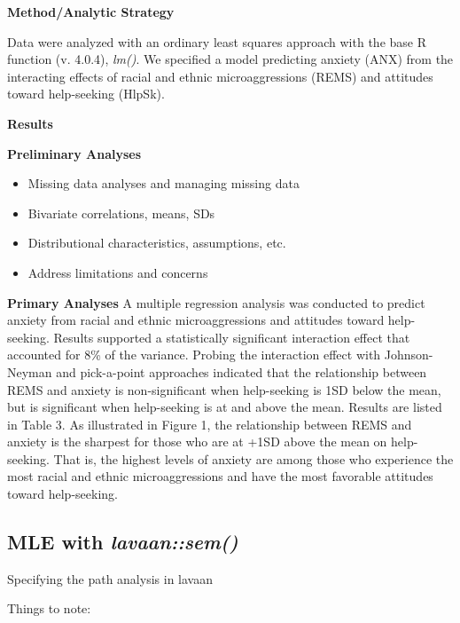 \documentclass[
  english,
]{book}
\providecommand{\tightlist}{%
  \setlength{\itemsep}{0pt}\setlength{\parskip}{0pt}}
\begin{document}
\textbf{Method/Analytic Strategy}

Data were analyzed with an ordinary least squares approach with the base R function (v. 4.0.4), \emph{lm()}. We specified a model predicting anxiety (ANX) from the interacting effects of racial and ethnic microaggressions (REMS) and attitudes toward help-seeking (HlpSk).

\textbf{Results}

\textbf{Preliminary Analyses}

\begin{itemize}
\tightlist
\item
  Missing data analyses and managing missing data
\item
  Bivariate correlations, means, SDs
\item
  Distributional characteristics, assumptions, etc.
\item
  Address limitations and concerns
\end{itemize}

\textbf{Primary Analyses}
A multiple regression analysis was conducted to predict anxiety from racial and ethnic microaggressions and attitudes toward help-seeking. Results supported a statistically significant interaction effect that accounted for 8\% of the variance. Probing the interaction effect with Johnson-Neyman and pick-a-point approaches indicated that the relationship between REMS and anxiety is non-significant when help-seeking is 1SD below the mean, but is significant when help-seeking is at and above the mean. Results are listed in Table 3. As illustrated in Figure 1, the relationship between REMS and anxiety is the sharpest for those who are at +1SD above the mean on help-seeking. That is, the highest levels of anxiety are among those who experience the most racial and ethnic microaggressions and have the most favorable attitudes toward help-seeking.

\hypertarget{mle-with-lavaansem}{%
\subsection{\texorpdfstring{MLE with \emph{lavaan::sem()}}{MLE with lavaan::sem()}}\label{mle-with-lavaansem}}

Specifying the path analysis in lavaan

Things to note:
\end{document}
